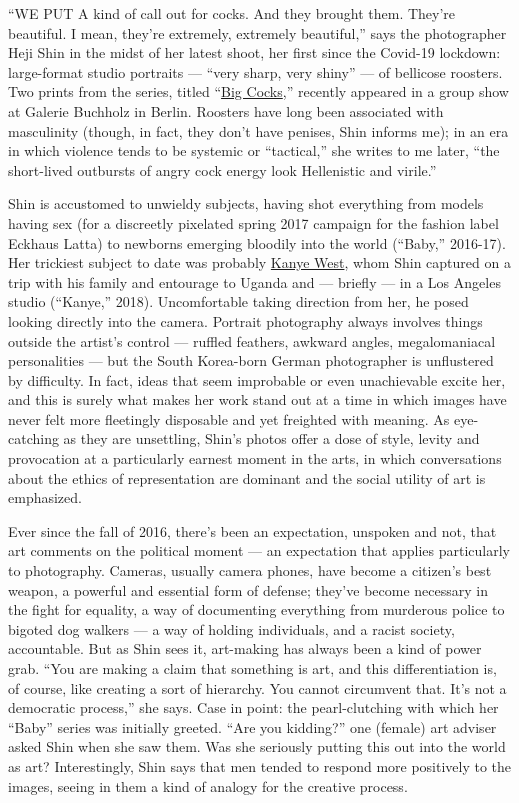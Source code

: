 ``WE PUT A kind of call out for cocks. And they brought them. They're
beautiful. I mean, they're extremely, extremely beautiful,'' says the
photographer Heji Shin in the midst of her latest shoot, her first since
the Covid-19 lockdown: large-format studio portraits --- ``very sharp,
very shiny'' --- of bellicose roosters. Two prints from the series,
titled
``\href{http://www.artnet.com/artists/heji-shin/big-cock-2-a-1yMY-WIAcK_wvpQ6kVrIHQ2}{Big
Cocks},'' recently appeared in a group show at Galerie Buchholz in
Berlin. Roosters have long been associated with masculinity (though, in
fact, they don't have penises, Shin informs me); in an era in which
violence tends to be systemic or ``tactical,'' she writes to me later,
``the short-lived outbursts of angry cock energy look Hellenistic and
virile.''

Shin is accustomed to unwieldy subjects, having shot everything from
models having sex (for a discreetly pixelated spring 2017 campaign for
the fashion label Eckhaus Latta) to newborns emerging bloodily into the
world (``Baby,'' 2016-17). Her trickiest subject to date was probably
\href{https://www.galeriebuchholz.de/exhibitions/heji-shin-berlin-2019/}{Kanye
West}, whom Shin captured on a trip with his family and entourage to
Uganda and --- briefly --- in a Los Angeles studio (``Kanye,'' 2018).
Uncomfortable taking direction from her, he posed looking directly into
the camera. Portrait photography always involves things outside the
artist's control --- ruffled feathers, awkward angles, megalomaniacal
personalities --- but the South Korea-born German photographer is
unflustered by difficulty. In fact, ideas that seem improbable or even
unachievable excite her, and this is surely what makes her work stand
out at a time in which images have never felt more fleetingly disposable
and yet freighted with meaning. As eye-catching as they are unsettling,
Shin's photos offer a dose of style, levity and provocation at a
particularly earnest moment in the arts, in which conversations about
the ethics of representation are dominant and the social utility of art
is emphasized.

Ever since the fall of 2016, there's been an expectation, unspoken and
not, that art comments on the political moment --- an expectation that
applies particularly to photography. Cameras, usually camera phones,
have become a citizen's best weapon, a powerful and essential form of
defense; they've become necessary in the fight for equality, a way of
documenting everything from murderous police to bigoted dog walkers ---
a way of holding individuals, and a racist society, accountable. But as
Shin sees it, art-making has always been a kind of power grab. ``You are
making a claim that something is art, and this differentiation is, of
course, like creating a sort of hierarchy. You cannot circumvent that.
It's not a democratic process,'' she says. Case in point: the
pearl-clutching with which her ``Baby'' series was initially greeted.
``Are you kidding?'' one (female) art adviser asked Shin when she saw
them. Was she seriously putting this out into the world as art?
Interestingly, Shin says that men tended to respond more positively to
the images, seeing in them a kind of analogy for the creative process.

